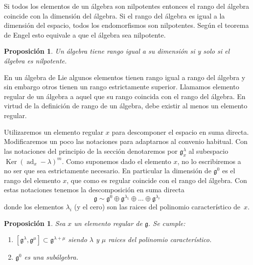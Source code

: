 \documentclass[a4paper,draft,12pt]{article}
\newtheorem{propo}[teo]{Proposición}%
\newcommand{\g}{\mathfrak{g}}%
\newcommand{\df}[1]{\textsf{\color{blue}#1}}
\DeclareMathOperator{\Ker}{Ker}%
\DeclareMathOperator{\ad}{ad}  %
\begin{document}
 Si todos los elementos de un álgebra son nilpotentes entonces el rango del álgebra coincide con la dimensión del álgebra.  Si el rango del álgebra es igual a la dimensión del espacio, todos los endomorfismos son nilpotentes.  Según el teorema de Engel esto equivale a que el álgebra sea nilpotente.
 
 \begin{propo}
 
 Un álgebra tiene rango igual a su dimensión si y solo si el álgebra es nilpotente.
 
 \end{propo}
 
 En un álgebra de Lie algunos elementos tienen rango igual a rango del álgebra y sin embargo otros tienen un rango estrictamente superior.  Llamamos  \df{elemento regular} de un álgebra a aquel que su rango coincida con el rango del álgebra.   En virtud de la definición de rango de un álgebra, debe existir al menos un elemento regular.
 
 Utilizaremos un elemento regular $x$ para descomponer el espacio en suma directa.  Modificaremos un poco las notaciones para adaptarnos al convenio habitual.  Con las notaciones del principio de la sección denotaremos por $\g_x^\lambda$ al subespacio $\Ker(\ad_x-\lambda)^m$. Como suponemos dado el elemento $x$,  no lo escribiremos a no ser que sea estrictamente necesario.  En particular la dimensión de  $\g^0$ es el rango del elemento $x$, que como es regular coincide con el rango del álgebra.  Con estas notaciones tenemos la descomposición en suma directa
 $$
 \g \sim \g^0 \oplus \g^{\lambda_1} \oplus \dots \oplus \g^{\lambda_r}
 $$
 donde los elementos $\lambda_i$ (y el cero) son las raices del polinomio característico de~$x$.
 
 \begin{propo}
 
 Sea $x$ un elemento regular de $\g$.  Se cumple:
 
 \begin{enumerate}[\indent 1.- ]
 
 \item $[\g^\lambda, \g^\mu] \subset \g^{\lambda+\mu}$ siendo $\lambda $ y $\mu$ raices del polinomio característico.
 
 \item  $\g^0$ es una subálgebra.
 
 \end{enumerate}
 
 \end{propo}
 
\end{document}
